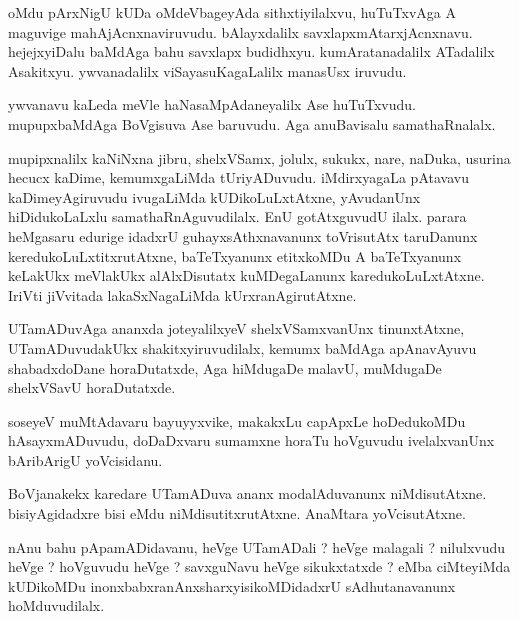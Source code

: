 \documentclass{article}
\begin{document}
\begin{mn}
oMdu  pArxNigU  kUDa  oMdeVbageyAda  sithxtiyilalxvu,  huTuTxvAga  A  maguvige  mahAjAcnxnaviruvudu.  bAlayxdalilx  
savxlapxmAtarxjAcnxnavu.  hejejxyiDalu  baMdAga  bahu  savxlapx  budidhxyu.  kumAratanadalilx  ATadalilx  Asakitxyu.  
ywvanadalilx  viSayasuKagaLalilx  manasUsx  iruvudu.
\end{mn}

\begin{mn}
ywvanavu  kaLeda  meVle  haNasaMpAdaneyalilx  Ase  huTuTxvudu.  mupupxbaMdAga  BoVgisuva  Ase  baruvudu.  Aga  
anuBavisalu  samathaRnalalx.
\end{mn}

\begin{mn}
mupipxnalilx  kaNiNxna  jibru,  shelxVSamx,  jolulx,  sukukx,  nare,  naDuka,  usurina  hecucx kaDime,  
kemumxgaLiMda  tUriyADuvudu.  iMdirxyagaLa  pAtavavu  kaDimeyAgiruvudu  ivugaLiMda  kUDikoLuLxtAtxne,  
yAvudanUnx  hiDidukoLaLxlu  samathaRnAguvudilalx.  EnU  gotAtxguvudU  ilalx.  parara  heMgasaru  edurige  
idadxrU  guhayxsAthxnavanunx  toVrisutAtx  taruDanunx  keredukoLuLxtitxrutAtxne,  baTeTxyanunx  etitxkoMDu  
A  baTeTxyanunx  keLakUkx  meVlakUkx  alAlxDisutatx  kuMDegaLanunx  karedukoLuLxtAtxne.  IriVti  jiVvitada  
lakaSxNagaLiMda  kUrxranAgirutAtxne.
\end{mn}

\begin{mn}
UTamADuvAga  ananxda  joteyalilxyeV  shelxVSamxvanUnx  tinunxtAtxne,  UTamADuvudakUkx  shakitxyiruvudilalx,  kemumx  
baMdAga  apAnavAyuvu  shabadxdoDane  horaDutatxde,  Aga  hiMdugaDe  malavU,  muMdugaDe  shelxVSavU  horaDutatxde.
\end{mn}

\begin{mn}
soseyeV  muMtAdavaru  bayuyyxvike,  makakxLu  capApxLe  hoDedukoMDu  hAsayxmADuvudu,  doDaDxvaru  
sumamxne  horaTu  hoVguvudu  ivelalxvanUnx  bAribArigU  yoVcisidanu.
\end{mn}

\begin{mn}
BoVjanakekx  karedare  UTamADuva  ananx  modalAduvanunx  niMdisutAtxne.  bisiyAgidadxre  bisi  eMdu  
niMdisutitxrutAtxne.  AnaMtara  yoVcisutAtxne.
\end{mn}

\begin{mn}
nAnu  bahu  pApamADidavanu,  heVge  UTamADali ?  heVge  malagali ?  nilulxvudu  heVge ?  hoVguvudu  heVge ?  
savxguNavu  heVge  sikukxtatxde ?  eMba  ciMteyiMda  kUDikoMDu  inonxbabxranAnxsharxyisikoMDidadxrU  
sAdhutanavanunx  hoMduvudilalx.
\end{mn}
\end{document}
